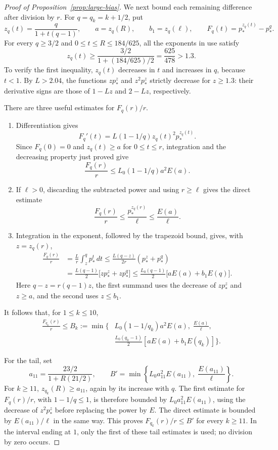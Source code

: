 \begin{proof}[Proof of Proposition~\ref{prop:large-bias}]
We next bound each remaining difference after division by $r$.
For $q=q_k=k+1/2$, put
\[
 z_q(t)=\frac q{1+t(q-1)},\qquad
 a=z_q(R),\qquad b_1=z_q(\ell),\qquad
 F_q(t)=p_*^{z_q(t)}-p_*^q.
\]
For every $q\ge3/2$ and $0\le t\le R\le184/625$, all the exponents
in use satisfy
\begin{equation}\label{lb:exponent-range}
 z_q(t)\ge\frac{3/2}{1+(184/625)/2}
 =\frac{625}{478}>1.3.
\end{equation}
To verify the first inequality, $z_q(t)$ decreases in $t$ and increases
in $q$, because $t<1$.
By $L>2.04$, the functions $z p_*^z$ and $z^2p_*^z$ strictly decrease
for $z\ge1.3$: their derivative signs are those of $1-Lz$ and
$2-Lz$, respectively.

There are three useful estimates for $F_q(r)/r$.
\begin{enumerate}
\item Differentiation gives
\[
 F_q'(t)=L(1-1/q)z_q(t)^2p_*^{z_q(t)}.
\]
Since $F_q(0)=0$ and $z_q(t)\ge a$ for $0\le t\le r$, integration
and the decreasing property just proved give
\[
 \frac{F_q(r)}r\le L_0(1-1/q)a^2E(a).
\]
\item If $\ell>0$, discarding the subtracted power and using
$r\ge\ell$ gives the direct estimate
\[
 \frac{F_q(r)}r\le\frac{p_*^{z_q(r)}}{\ell}
 \le\frac{E(a)}\ell.
\]
\item Integration in the exponent, followed by the trapezoid bound,
gives, with $z=z_q(r)$,
\begin{align*}
 \frac{F_q(r)}r
 &=\frac Lr\int_z^q p_*^t\,dt
 \le\frac{L(q-z)}{2r}(p_*^z+p_*^q)\\
 &=\frac{L(q-1)}2\bigl[zp_*^z+zp_*^q\bigr]
 \le\frac{L_0(q-1)}2\bigl[aE(a)+b_1E(q)\bigr].
\end{align*}
Here $q-z=r(q-1)z$, the first summand uses the decrease of $zp_*^z$
and $z\ge a$, and the second uses $z\le b_1$.
\end{enumerate}
It follows that, for $1\le k\le10$,
\begin{equation}\label{lb:Bk}
 \begin{split}
 \frac{F_{q_k}(r)}r\le B_k:=\min\biggl\{&
 L_0(1-1/q_k)a^2E(a),\;
 \frac{E(a)}\ell,\\
 &\frac{L_0(q_k-1)}2[aE(a)+b_1E(q_k)]
 \biggr\}.
 \end{split}
\end{equation}

For the tail, set
\begin{equation}\label{lb:Btail}
 a_{11}=\frac{23/2}{1+R(21/2)},\qquad
 B'=\min\left\{L_0a_{11}^2E(a_{11}),\;
                   \frac{E(a_{11})}\ell\right\}.
\end{equation}
For $k\ge11$, $z_{q_k}(R)\ge a_{11}$, again by its increase with $q$.
The first estimate for $F_q(r)/r$, with $1-1/q\le1$, is therefore
bounded by $L_0a_{11}^2E(a_{11})$, using the decrease of $z^2p_*^z$
before replacing the power by $E$.
The direct estimate is bounded by $E(a_{11})/\ell$ in the same way.
This proves $F_{q_k}(r)/r\le B'$ for every $k\ge11$.
In the interval ending at $1$, only the first of these tail estimates
is used; no division by zero occurs.


\end{proof}
